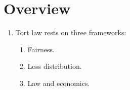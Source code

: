 \section{Overview}

\begin{enumerate}
    \item Tort law rests on three frameworks:
    \begin{enumerate}
        \item Fairness.
        \item Loss distribution.
        \item Law and economics.
    \end{enumerate}
\end{enumerate}



